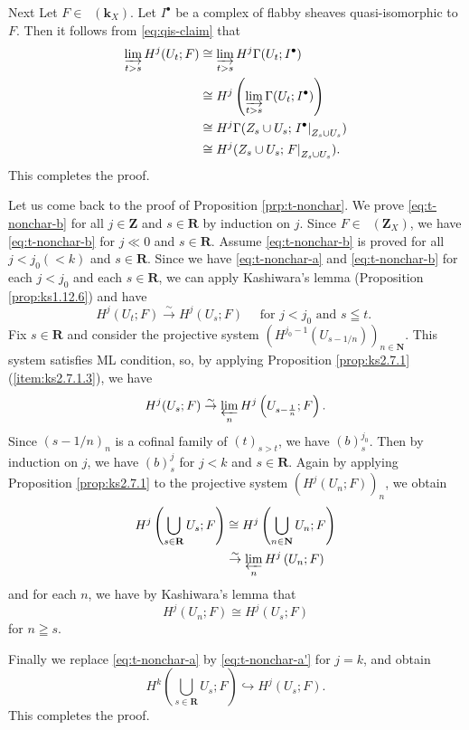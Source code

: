 ﻿\documentclass[a4paper,leqno]{jsarticle}
\makeatletter
\theoremstyle{definition}
\newcommand{\nn}{\mathbf{N}}
\newcommand{\zz}{\mathbf{Z}}
\newcommand{\rr}{\mathbf{R}}
\newcommand{\kk}{\mathbf{k}}
\renewenvironment{proof}[1][\proofname]{\par
  \pushQED{\qed}%
  \normalfont \topsep6\p@\@plus6\p@\relax
  \trivlist
  \item[\hskip\labelsep
         \bfseries
    {#1}]\ignorespaces
}{%
  \popQED\endtrivlist\@endpefalse
}
\renewcommand{\proofname}{Proof.}
\numberwithin{equation}{section}
\newcommand{\Dompl}{\mathop{\mathsf{D}^\mathrm{+}}\nolimits}
\newcommand{\simar}{\mathrel{\overset{\sim}{\rightarrow}}}%
\newcommand{\indlim}[1][]{\mathop{\varinjlim}\limits_{#1}}
\newcommand{\prolim}[1][]{\mathop{\varprojlim}\limits_{#1}}
\newcommand{\mres}[2][]{{\left.{#1}\right\rvert}_{#2}}
\theoremstyle{mystyle}
\makeatother
\begin{document}
\begin{proof}
\begin{proof}[Proof of Lemma \ref{clm:ind-nonchar}]
    Next Let \(F\in\Dompl(\kk_X)\). 
    Let \(I^{\bm{\bullet}}\) be a complex of flabby sheaves 
    quasi-isomorphic to \(F\). 
    Then  it follows from \eqref{eq:qis-claim} that 
    \begin{align*}
      \indlim[t>s]H^{j}(U_t;F)
      &\cong 
      \indlim[t>s]H^{j}\Gamma(U_t;I^{\bullet})\\
      &\cong 
      H^{j}\left(\indlim[t>s]\Gamma(U_t;I^{\bullet})\right)\\
      &\cong
      H^{j}\Gamma(
        Z_{s}\cup U_{s};
        \mres[I^{\bullet}]{Z_{s}\cup U_{s}})\\
      &\cong
      H^{j}(Z_{s}\cup U_{s};\mres[F]{Z_{s}\cup U_{s}}).
    \end{align*}
    This completes the proof.
  \end{proof}

  Let us come back to the proof of 
  Proposition \ref{prp:t-nonchar}. 
  We prove \ref{eq:t-nonchar-b} for 
  all \(j\in\zz\) and \(s\in\rr\) by induction on \(j\). 
  Since \(F\in\Dompl(\zz_X)\), 
  we have \ref{eq:t-nonchar-b} for \(j\ll 0\) and \(s\in\rr\). 
  Assume \ref{eq:t-nonchar-b} is proved for 
  all \(j< j_{0} (<k)\) and \(s\in\rr\). 
  Since we have \ref{eq:t-nonchar-a} and \ref{eq:t-nonchar-b} 
  for each \(j< j_{0}\) and each \(s\in\rr\), 
  we can apply 
  Kashiwara's lemma (Proposition \ref{prop:ks1.12.6}) 
  and have\[
    H^{j}(U_{t};F)\simar H^{j}(U_{s};F) 
    \quad
    \text{ for \(j< j_{0}\) and \(s\leqq t\). }
  \]
  Fix \(s\in\rr\) and consider the projective system \(
    \left(H^{j_{0}-1}(U_{s-1/n})\right)_{n\in\nn}
  \). This system satisfies ML condition, 
  so, by applying 
  Proposition \ref{prop:ks2.7.1} (\ref{item:ks2.7.1.3}), 
  we have \[
    H^{j}(U_{s};F)
    \simar 
    \prolim[n]H^{j}\left(U_{s-\frac{1}{n}};F\right). 
  \]
  Since \((s-1/n)_{n}\) is a cofinal family of \((t)_{s>t}\), 
  we have \((b)_{s}^{j_{0}}\). 
  Then by induction on \(j\), 
  we have \((b)_{s}^{j}\) for \(j<k\) and \(s\in\rr\). 
  Again by applying Proposition \ref{prop:ks2.7.1} to the 
  projective system \(\left(H^{j}(U_{n};F)\right)_{n}\), 
  we obtain 
  \begin{align*}
    H^{j}\left(\bigcup_{s\in\rr}U_{s};F\right)
    &\cong
    H^{j}\left(\bigcup_{n\in\nn}U_{n};F\right)\\
    &\simar 
    \prolim[n]H^{j}\left(U_{n};F\right)
  \end{align*}
  and for each \(n\), we have by Kashiwara's lemma that
  \[
    H^{j}\left(U_{n};F\right)
    \cong
    H^{j}(U_{s};F)
  \]
  for \(n\geqq s\).

  Finally we replace \ref{eq:t-nonchar-a} by 
  \ref{eq:t-nonchar-a'} for \(j=k\), and obtain
  \[
    H^{k}\left(\bigcup_{s\in\rr}U_{s};F\right)
    \hookrightarrow
    H^{j}\left(U_{s};F\right).
  \]
  This completes the proof. 
\end{proof}
\end{document}
